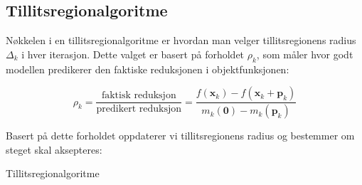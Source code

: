 \subsection{Tillitsregionalgoritme}
\label{subsec:trust_region_algorithm}

Nøkkelen i en tillitsregionalgoritme er hvordan man velger tillitsregionens radius \( \Delta_k \) i hver iterasjon. Dette valget er basert på forholdet \( \rho_k \), som måler hvor godt modellen predikerer den faktiske reduksjonen i objektfunksjonen:

\begin{equation}
	\rho_k = \frac{\text{faktisk reduksjon}}{\text{predikert reduksjon}} = \frac{f(\symbf{x}_k) - f(\symbf{x}_k + \symbf{p}_k)}{m_k(\symbf{0}) - m_k(\symbf{p}_k)}
\end{equation}

Basert på dette forholdet oppdaterer vi tillitsregionens radius og bestemmer om steget skal aksepteres:

\begin{algorithm}[H]
	\SetAlgoLined
	\caption{Tillitsregionalgoritme}
	\label{alg:trust_region_2}
\end{algorithm}
